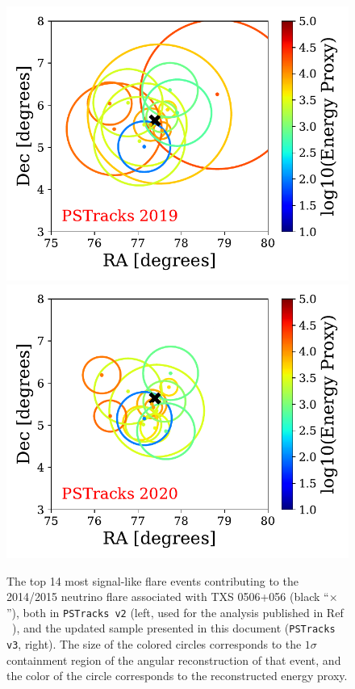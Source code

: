 \documentclass[aps,10pt,prd,twocolumn,floats,letterpaper,showpacs,nofootinbib,bibnotes,notitlepage,superscriptaddress,floatfix]{revtex4-1}
\newcommand{\MA}[1]{{\color{magenta}#1}}
\begin{document}
\begin{figure}[p]
\centering
 \includegraphics[width=.45\linewidth]{./TXSCheckPlots/PSTracksv2evtplot.pdf}\hspace{0.2in}\includegraphics[width=.45\linewidth]{./TXSCheckPlots/PSTracksv3evtplot.pdf}
\caption[]{The top 14 most signal-like flare events contributing to the 2014/2015 neutrino flare associated with TXS 0506+056 (black ``$\times$''), both in \MA{\tt PSTracks v2} (left, used for the analysis published in Ref ~\cite{IceCube:2018cha}), and the updated sample presented in this document ({\tt PSTracks v3}, right). The size of the colored circles corresponds to the $1\sigma$ containment region of the angular reconstruction of that event, and the color of the circle corresponds to the reconstructed energy proxy.}\label{fig:TXSEvtsCompare}
\end{figure}
\end{document}
